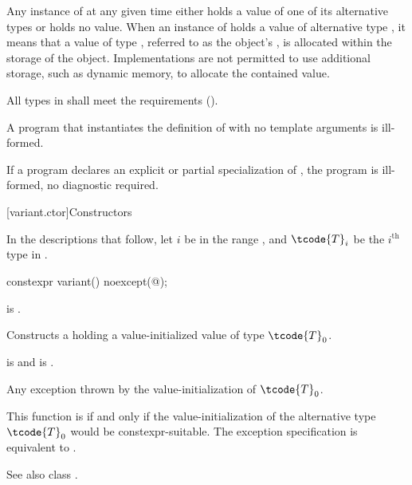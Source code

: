 \pnum
Any instance of  at any given time either holds a value
of one of its alternative types or holds no value.
When an instance of  holds a value of alternative type ,
it means that a value of type , referred to as the 
object's , is allocated within the storage of the
 object.
Implementations are not permitted to use additional storage, such as dynamic
memory, to allocate the contained value.

\pnum
All types in  shall meet
the  requirements ().

\pnum
A program that instantiates the definition of  with
no template arguments is ill-formed.

\pnum
If a program declares an explicit or partial specialization of ,
the program is ill-formed, no diagnostic required.

[variant.ctor]{Constructors}

\pnum
In the descriptions that follow, let $i$ be in the range ,
and $\tcode{T}_i$ be the $i^\text{th}$ type in .

%
\begin{itemdecl}
constexpr variant() noexcept(@\seebelow@);
\end{itemdecl}

\begin{itemdescr}
\pnum
\constraints
{} is .

\pnum
\effects
Constructs a  holding a value-initialized value of type $\tcode{T}_0$.

\pnum
\ensures
{} is  and  is .

\pnum
\throws
Any exception thrown by the value-initialization of $\tcode{T}_0$.

\pnum
\remarks
This function is  if and only if the
value-initialization of the alternative type $\tcode{T}_0$
would be constexpr-suitable.
The exception specification is equivalent to
.
\begin{note}
See also class .
\end{note}
\end{itemdescr}

